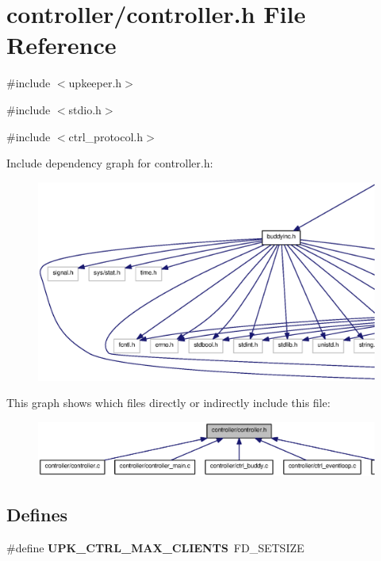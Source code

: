 \section{controller/controller.h File Reference}
\label{controller_8h}
{\ttfamily \#include $<$upkeeper.h$>$}\par
{\ttfamily \#include $<$stdio.h$>$}\par
{\ttfamily \#include $<$ctrl\_\-protocol.h$>$}\par
Include dependency graph for controller.h:\nopagebreak
\begin{figure}[H]
\begin{center}
\leavevmode
\includegraphics[width=400pt]{controller_8h__incl}
\end{center}
\end{figure}
This graph shows which files directly or indirectly include this file:\nopagebreak
\begin{figure}[H]
\begin{center}
\leavevmode
\includegraphics[width=400pt]{controller_8h__dep__incl}
\end{center}
\end{figure}
\subsection*{Defines}
\begin{DoxyCompactItemize}
\item 
\#define {\bf UPK\_\-CTRL\_\-MAX\_\-CLIENTS}~FD\_\-SETSIZE
\end{DoxyCompactItemize}
